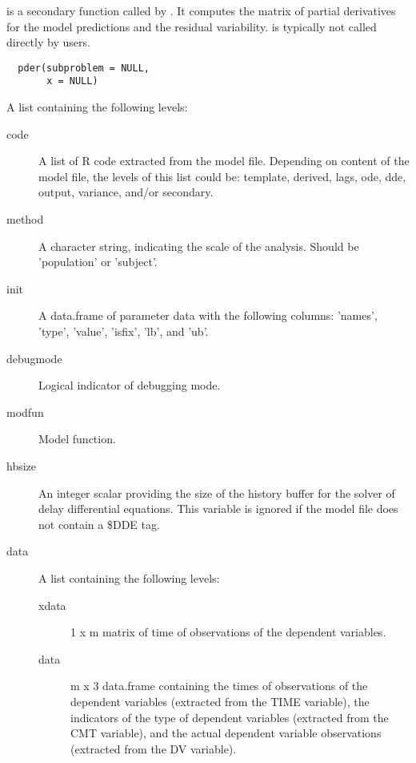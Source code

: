 %
\begin{Description}\relax
{} is a secondary function called by . It 
computes the matrix of partial derivatives for the model predictions and the
residual variability.  is typically not called directly by users.
\end{Description}
%
\begin{Usage}
\begin{verbatim}
  pder(subproblem = NULL,
       x = NULL)
\end{verbatim}
\end{Usage}
%
\begin{Arguments}
\begin{ldescription}
\item[\code{subproblem}] A list containing the following levels:\begin{description}

\item[code] A list of R code extracted from the model file. Depending on 
content of the model file, the levels of this list could be: template,
derived, lags, ode, dde, output, variance, and/or secondary.
\item[method] A character string, indicating the scale of the analysis. Should
be 'population' or 'subject'.
\item[init] A data.frame of parameter data with the following columns:
'names', 'type', 'value', 'isfix', 'lb', and 'ub'.
\item[debugmode] Logical indicator of debugging mode.
\item[modfun] Model function.
\item[hbsize] An integer scalar providing the size of the history buffer for
the solver of delay differential equations. This variable is ignored if
the model file does not contain a \$DDE tag.
\item[data] A list containing the following levels:\begin{description}

\item[xdata] 1 x m matrix of time of observations of the dependent
variables.
\item[data] m x 3 data.frame containing the times of observations of the
dependent variables (extracted from the TIME variable), the indicators 
of the type of dependent variables (extracted from the CMT variable), 
and the actual dependent variable observations (extracted from the DV 
variable).


\end{description}
\end{description}
\end{ldescription}
\end{Arguments}
